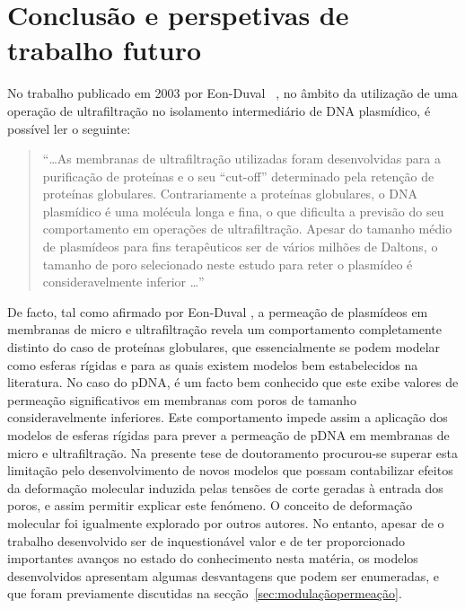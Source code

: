\chapter{Conclusão e perspetivas de trabalho futuro} %
\label{cha:conc}
No trabalho publicado em 2003 por Eon-Duval \et\ \cite{duvaltff}, no âmbito da utilização de uma operação de ultrafiltração no isolamento intermediário de DNA plasmídico, é possível ler o seguinte:
\begin{quote}
``\ldots As membranas de ultrafiltração utilizadas foram desenvolvidas para a purificação de proteínas e o seu ``cut-off'' determinado pela retenção de proteínas globulares. Contrariamente a proteínas globulares, o DNA plasmídico é uma molécula longa e fina, o que dificulta a previsão do seu comportamento em operações de ultrafiltração. Apesar do tamanho médio de plasmídeos para fins terapêuticos ser de vários milhões de Daltons, o tamanho de poro selecionado neste estudo para reter o plasmídeo é consideravelmente inferior \ldots'' 
\end{quote}
De facto, tal como afirmado por Eon-Duval \et, a permeação de plasmídeos em membranas de micro e ultrafiltração revela um comportamento completamente distinto do caso de proteínas globulares, que essencialmente se podem modelar como esferas rígidas e para as quais existem modelos bem estabelecidos na literatura. No caso do pDNA, é um facto bem conhecido que este exibe valores de permeação significativos em membranas com poros de tamanho consideravelmente inferiores. Este comportamento impede assim a aplicação dos modelos de esferas rígidas para prever a permeação de pDNA em membranas de micro e ultrafiltração. Na presente tese de doutoramento procurou-se superar esta limitação pelo desenvolvimento de novos modelos que possam contabilizar efeitos da deformação molecular induzida pelas tensões de corte geradas à entrada dos poros, e assim permitir explicar este fenómeno. O conceito de deformação molecular foi igualmente explorado por outros autores. No entanto, apesar de o trabalho desenvolvido ser de inquestionável valor e de ter proporcionado importantes avanços no estado do conhecimento nesta matéria, os modelos desenvolvidos apresentam algumas desvantagens que podem ser enumeradas, e que foram previamente discutidas na secção~\ref{sec:modulaçãopermeação}. 

